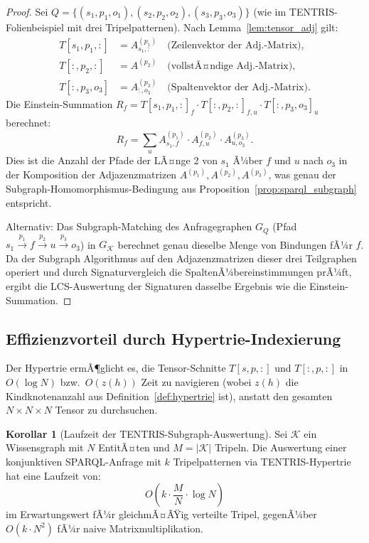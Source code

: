 ﻿\documentclass[a4paper,12pt]{article}
\theoremstyle{definition}
\newtheorem{korollar}{Korollar}
\begin{document}
\begin{proof}
Sei $Q = \{(s_1,p_1,o_1), (s_2,p_2,o_2), (s_3,p_3,o_3)\}$ (wie im TENTRIS-Folienbeispiel
mit drei Tripelpatternen). Nach Lemma~\ref{lem:tensor_adj} gilt:
\begin{align*}
  T[s_1,p_1,:] &= A^{(p_1)}_{s_1,:} \quad \text{(Zeilenvektor der Adj.-Matrix)}, \\
  T[:,p_2,:]   &= A^{(p_2)}           \quad \text{(vollstÃ¤ndige Adj.-Matrix)}, \\
  T[:,p_3,o_3] &= A^{(p_3)}_{:,o_3} \quad \text{(Spaltenvektor der Adj.-Matrix)}.
\end{align*}
Die Einstein-Summation
$R_f = T[s_1,p_1,:]_f \cdot T[:,p_2,:]_{f,u} \cdot T[:,p_3,o_3]_u$
berechnet:
\[
  R_f = \sum_u A^{(p_1)}_{s_1,f} \cdot A^{(p_2)}_{f,u} \cdot A^{(p_3)}_{u,o_3}.
\]
Dies ist die Anzahl der Pfade der LÃ¤nge 2 von $s_1$ Ã¼ber $f$ und $u$ nach $o_3$
in der Komposition der Adjazenzmatrizen $A^{(p_1)}, A^{(p_2)}, A^{(p_3)}$, was
genau der Subgraph-Homomorphismus-Bedingung aus Proposition~\ref{prop:sparql_subgraph}
entspricht.

Alternativ: Das Subgraph-Matching des Anfragegraphen $G_Q$ (Pfad
$s_1 \xrightarrow{p_1} f \xrightarrow{p_2} u \xrightarrow{p_3} o_3$) in
$G_{\mathcal{K}}$ berechnet genau dieselbe Menge von Bindungen fÃ¼r $f$.
Da der Subgraph Algorithmus auf den Adjazenzmatrizen dieser drei Teilgraphen
operiert und durch Signaturvergleich die SpaltenÃ¼bereinstimmungen prÃ¼ft, ergibt
die LCS-Auswertung der Signaturen dasselbe Ergebnis wie die Einstein-Summation.
\end{proof}

\subsection{Effizienzvorteil durch Hypertrie-Indexierung}

Der Hypertrie ermÃ¶glicht es, die Tensor-Schnitte $T[s,p,:]$ und $T[:,p,:]$ in
$O(\log N)$ bzw.\ $O(z(h))$ Zeit zu navigieren (wobei $z(h)$ die Kindknotenanzahl
aus Definition~\ref{def:hypertrie} ist), anstatt den gesamten $N \times N \times N$
Tensor zu durchsuchen.

\begin{korollar}[Laufzeit der TENTRIS-Subgraph-Auswertung]
Sei $\mathcal{K}$ ein Wissensgraph mit $N$ EntitÃ¤ten und $M = |\mathcal{K}|$ Tripeln.
Die Auswertung einer konjunktiven SPARQL-Anfrage mit $k$ Tripelpatternen via
TENTRIS-Hypertrie hat eine Laufzeit von:
\[
  O\!\left(k \cdot \frac{M}{N} \cdot \log N\right)
\]
im Erwartungswert fÃ¼r gleichmÃ¤ÃŸig verteilte Tripel, gegenÃ¼ber $O(k \cdot N^2)$ fÃ¼r
naive Matrixmultiplikation.
\end{korollar}
\end{document}

